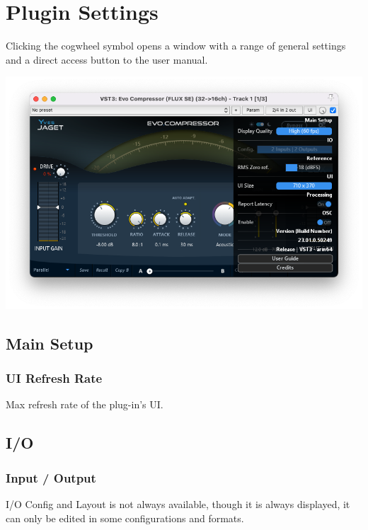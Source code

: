 \documentclass[
  letterpaper,
  DIV=11,
  numbers=noendperiod]{scrreport}
\begin{document}

\hypertarget{plugin-settings}{%
\chapter{Plugin Settings}\label{plugin-settings}}

Clicking the cogwheel symbol opens a window with a range of general
settings and a direct access button to the user manual.

\includegraphics{include/evoComp_opt.png}

\hypertarget{main-setup}{%
\section{Main Setup}\label{main-setup}}

\hypertarget{ui-refresh-rate}{%
\subsection{UI Refresh Rate}\label{ui-refresh-rate}}

Max refresh rate of the plug-in's UI.

\hypertarget{io}{%
\section{I/O}\label{io}}

\hypertarget{input-output}{%
\subsection{Input / Output}\label{input-output}}

I/O Config and Layout is not always available, though it is always
displayed, it can only be edited in some configurations and formats.
\end{document}
